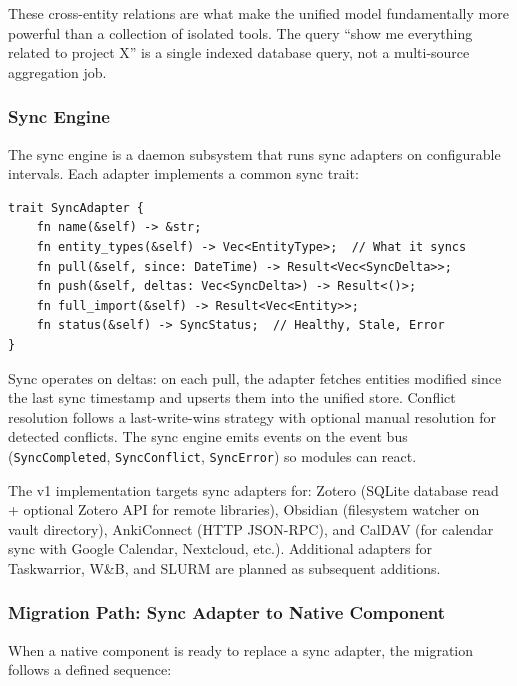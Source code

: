 \documentclass[11pt,a4paper]{article}
\begin{document}
These cross-entity relations are what make the unified model fundamentally more powerful than a collection of isolated tools. The query ``show me everything related to project X'' is a single indexed database query, not a multi-source aggregation job.

\subsubsection{Sync Engine}

The sync engine is a daemon subsystem that runs sync adapters on configurable intervals. Each adapter implements a common sync trait:

\begin{lstlisting}[language={}]
trait SyncAdapter {
    fn name(&self) -> &str;
    fn entity_types(&self) -> Vec<EntityType>;  // What it syncs
    fn pull(&self, since: DateTime) -> Result<Vec<SyncDelta>>;
    fn push(&self, deltas: Vec<SyncDelta>) -> Result<()>;
    fn full_import(&self) -> Result<Vec<Entity>>;
    fn status(&self) -> SyncStatus;  // Healthy, Stale, Error
}
\end{lstlisting}

Sync operates on deltas: on each pull, the adapter fetches entities modified since the last sync timestamp and upserts them into the unified store. Conflict resolution follows a last-write-wins strategy with optional manual resolution for detected conflicts. The sync engine emits events on the event bus (\texttt{SyncCompleted}, \texttt{SyncConflict}, \texttt{SyncError}) so modules can react.

\begin{notebox}
The v1 implementation targets sync adapters for: Zotero (SQLite database read + optional Zotero API for remote libraries), Obsidian (filesystem watcher on vault directory), AnkiConnect (HTTP JSON-RPC), and CalDAV (for calendar sync with Google Calendar, Nextcloud, etc.). Additional adapters for Taskwarrior, W\&B, and SLURM are planned as subsequent additions.
\end{notebox}

\subsubsection{Migration Path: Sync Adapter to Native Component}

When a native component is ready to replace a sync adapter, the migration follows a defined sequence:
\end{document}
